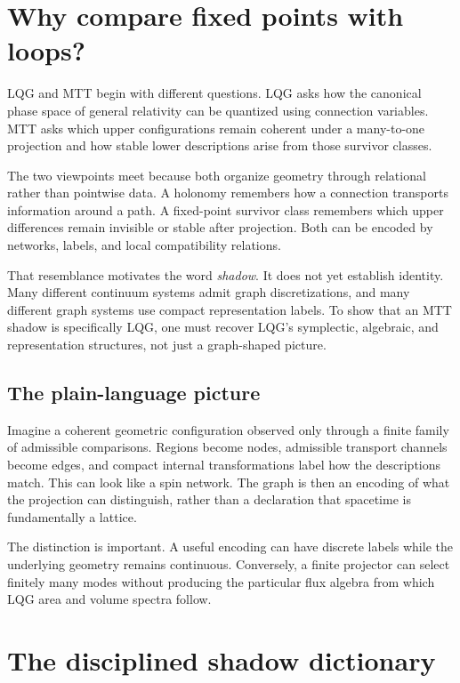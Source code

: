 \documentclass[11pt]{article}
\begin{document}
\tableofcontents

\section{Why compare fixed points with loops?}

LQG and MTT begin with different questions. LQG asks how the canonical phase
space of general relativity can be quantized using connection variables.
MTT asks which upper configurations remain coherent under a many-to-one
projection and how stable lower descriptions arise from those survivor
classes.

The two viewpoints meet because both organize geometry through relational
rather than pointwise data. A holonomy remembers how a connection transports
information around a path. A fixed-point survivor class remembers which
upper differences remain invisible or stable after projection. Both can be
encoded by networks, labels, and local compatibility relations.

That resemblance motivates the word \emph{shadow}. It does not yet establish
identity. Many different continuum systems admit graph discretizations, and
many different graph systems use compact representation labels. To show that
an MTT shadow is specifically LQG, one must recover LQG's symplectic,
algebraic, and representation structures, not just a graph-shaped picture.

\subsection{The plain-language picture}

Imagine a coherent geometric configuration observed only through a finite
family of admissible comparisons. Regions become nodes, admissible transport
channels become edges, and compact internal transformations label how the
descriptions match. This can look like a spin network. The graph is then an
encoding of what the projection can distinguish, rather than a declaration
that spacetime is fundamentally a lattice.

The distinction is important. A useful encoding can have discrete labels
while the underlying geometry remains continuous. Conversely, a finite
projector can select finitely many modes without producing the particular
flux algebra from which LQG area and volume spectra follow.

\section{The disciplined shadow dictionary}
\end{document}
